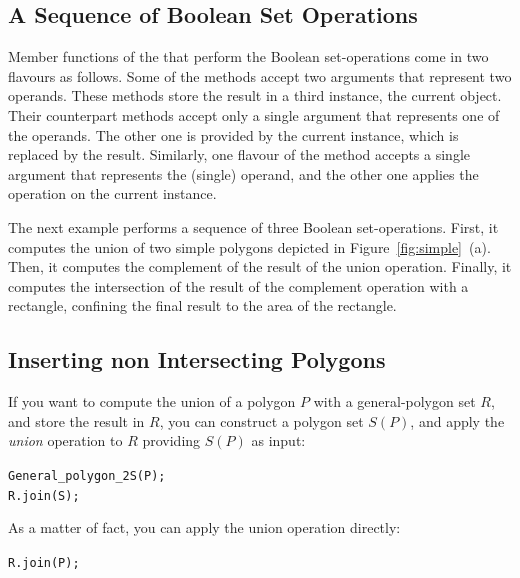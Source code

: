 \subsection{A Sequence of Boolean Set Operations}
\label{bso_ssec:sequence}
Member functions of the  that perform the
Boolean set-operations come in two flavours as follows. Some of the 
methods accept two arguments that represent two operands. These methods 
store the result in a third instance, the current object. Their 
counterpart methods accept only a single argument that represents one of 
the operands. The other one is provided by the current instance, which is 
replaced by the result. Similarly, one flavour of the  
method accepts a single argument that represents the (single) operand, 
and the other one applies the operation on the current instance.

The next example performs a sequence of three Boolean set-operations.
First, it computes the union of two simple polygons depicted in
Figure~\ref{fig:simple}~(a). Then, it computes the complement of the result
of the union operation. Finally, it computes the intersection of the result
of the complement operation with a rectangle, confining the final result to 
the area of the rectangle.


\subsection{Inserting non Intersecting Polygons}
\label{bso_ssec:insert}
If you want to compute the union of a polygon $P$ with a
general-polygon set $R$, and store the result in $R$, you can construct
a polygon set $S(P)$, and apply the {\em union} operation to
$R$ providing $S(P)$ as input:

\begin{alltt}
General_polygon_2 S(P);
R.join(S);
\end{alltt}

As a matter of fact, you can apply the union operation directly:

\begin{alltt}
R.join(P);
\end{alltt}

